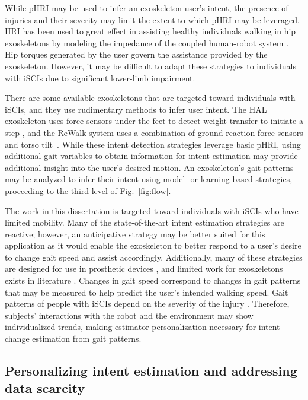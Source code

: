While pHRI may be used to infer an exoskeleton user's intent, the presence of injuries and their severity may limit the extent to which pHRI may be leveraged. HRI has been used to great effect in assisting healthy individuals walking in hip exoskeletons by modeling the impedance of the coupled human-robot system \cite{zhang2019admittance,nagarajan2016integral}. Hip torques generated by the user govern the assistance provided by the exoskeleton. However, it may be difficult to adapt these strategies to individuals with iSCIs due to significant lower-limb impairment. 

There are some available exoskeletons that are targeted toward individuals with iSCIs, and they use rudimentary methods to infer user intent. The HAL exoskeleton uses force sensors under the feet to detect weight transfer to initiate a step \cite{suzuki2007intention}, and the ReWalk system uses a combination of ground reaction force sensors and torso tilt~\cite{goffer2012locomotion}. While these intent detection strategies leverage basic pHRI, using additional gait variables to obtain information for intent estimation may provide additional insight into the user's desired motion. An exoskeleton's gait patterns may be analyzed to infer their intent using model- or learning-based strategies, proceeding to the third level of Fig.~\ref{fig:flow}. 

The work in this dissertation is targeted toward individuals with iSCIs who have limited mobility. Many of the state-of-the-art intent estimation strategies are reactive; however, an anticipative strategy may be better suited for this application as it would enable the exoskeleton to better respond to a user's desire to change gait speed and assist accordingly. Additionally, many of these strategies are designed for use in prosthetic devices \cite{young2013classifying,young2015classification,massalin2017user,thatte2019robust}, and limited work for exoskeletons exists in literature \cite{medrano2022analysis}. Changes in gait speed correspond to changes in gait patterns that may be measured to help predict the user's intended walking speed. Gait patterns of people with \mbox{iSCIs} depend on the severity of the injury \cite{rota2011walk}. Therefore, subjects' interactions with the robot and the environment may show individualized trends, making estimator personalization necessary for intent change estimation from gait patterns. 

\subsection{Personalizing intent estimation and addressing data scarcity}\label{sec:personalization}

